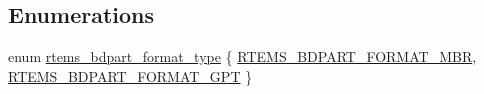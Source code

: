 \subsection*{Enumerations}
\begin{DoxyCompactItemize}
\item 
enum \mbox{\hyperlink{group__rtems__bdpart_ga688bdae263560502610c958bd45ff8af}{rtems\+\_\+bdpart\+\_\+format\+\_\+type}} \{ \mbox{\hyperlink{group__rtems__bdpart_gga688bdae263560502610c958bd45ff8afa1438658ed9ac308090fcfd6f671ed512}{R\+T\+E\+M\+S\+\_\+\+B\+D\+P\+A\+R\+T\+\_\+\+F\+O\+R\+M\+A\+T\+\_\+\+M\+BR}}, 
\mbox{\hyperlink{group__rtems__bdpart_gga688bdae263560502610c958bd45ff8afaa83a46115f9a9145ba010d99f67c128c}{R\+T\+E\+M\+S\+\_\+\+B\+D\+P\+A\+R\+T\+\_\+\+F\+O\+R\+M\+A\+T\+\_\+\+G\+PT}}
 \}
\end{DoxyCompactItemize}
